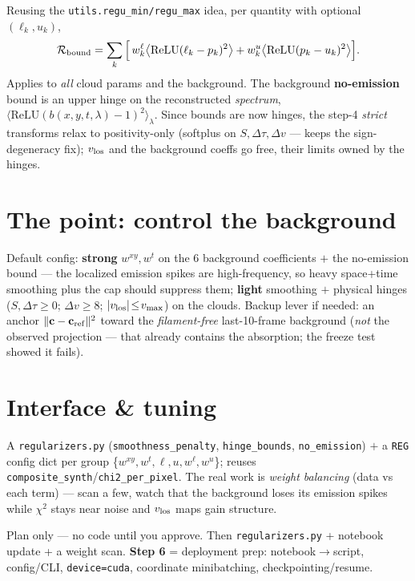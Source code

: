 \documentclass[10pt,a4paper]{article}
\newcommand{\co}[1]{{\small\texttt{#1}}}
\begin{document}
Reusing the \co{utils.regu\_min/regu\_max} idea, per quantity with optional $(\ell_k,u_k)$,
\[
\mathcal R_{\rm bound}=\sum_k\Big[\,w^{\ell}_k\big\langle\mathrm{ReLU}(\ell_k-p_k)^2\big\rangle
+w^{u}_k\big\langle\mathrm{ReLU}(p_k-u_k)^2\big\rangle\Big].
\]
Applies to \emph{all} cloud params and the background. The background \textbf{no-emission} bound is an upper hinge on the reconstructed \emph{spectrum}, $\big\langle\mathrm{ReLU}(b(x,y,t,\lambda)-1)^2\big\rangle_\lambda$. Since bounds are now hinges, the step-4 \emph{strict} transforms relax to positivity-only (softplus on $S,\Delta\tau,\Delta v$ --- keeps the sign-degeneracy fix); $v_{\rm los}$ and the background coeffs go free, their limits owned by the hinges.

\section{The point: control the background}

Default config: \textbf{strong} $w^{xy},w^{t}$ on the 6 background coefficients $+$ the no-emission bound --- the localized emission spikes are high-frequency, so heavy space+time smoothing plus the cap should suppress them; \textbf{light} smoothing $+$ physical hinges ($S,\Delta\tau\!\ge\!0$; $\Delta v\!\ge\!8$; $|v_{\rm los}|\!\le\!v_{\max}$) on the clouds. Backup lever if needed: an anchor $\lVert\mathbf c-\mathbf c_{\rm ref}\rVert^2$ toward the \emph{filament-free} last-10-frame background (\emph{not} the observed projection --- that already contains the absorption; the freeze test showed it fails).

\section{Interface \& tuning}

A \co{regularizers.py} (\co{smoothness\_penalty}, \co{hinge\_bounds}, \co{no\_emission}) $+$ a \co{REG} config dict per group \{$w^{xy},w^{t},\ell,u,w^\ell,w^u$\}; reuses \co{composite\_synth}/\co{chi2\_per\_pixel}. The real work is \emph{weight balancing} (data vs each term) --- scan a few, watch that the background loses its emission spikes while $\chi^2$ stays near noise and $v_{\rm los}$ maps gain structure.

\vspace{1pt}{\footnotesize\color{gry}\rule{\textwidth}{0.4pt}}
{\sffamily\color{gry}\footnotesize Plan only --- no code until you approve. Then \co{regularizers.py} + notebook update + a weight scan. \textbf{Step 6} = deployment prep: notebook$\rightarrow$script, config/CLI, \co{device=cuda}, coordinate minibatching, checkpointing/resume.}
\end{document}
